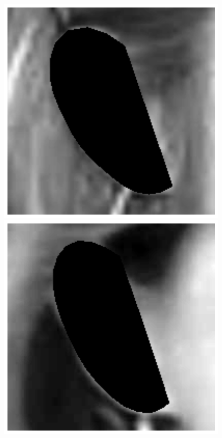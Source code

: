 \begin{figure}
    \\
    \includegraphics[height=\flowh]{resources/Ear_Deformable_Model/verification/background_exp/ear_bg_3}
    \includegraphics[height=\flowh]{resources/Ear_Deformable_Model/verification/background_exp/ear_bg_4}

\end{figure}
